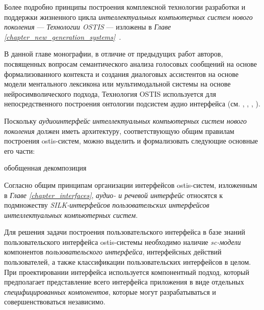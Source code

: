 Более подробно принципы построения комплексной технологии разработки и поддержки жизненного цикла \textit{интеллектуальных компьютерных систем нового поколения} --- \textit{Технологии OSTIS} --- изложены в \textit{Главе \ref{chapter_new_generation_systems}~}.

В данной главе монографии, в отличие от предыдущих работ авторов, посвященных вопросам семантического анализа голосовых сообщений на основе формализованного контекста и создания диалоговых ассистентов на основе модели ментального лексикона или мультимодальной системы на основе нейросимволического подхода, Технология OSTIS используется для непосредственного построения онтологии подсистем аудио интерфейса (см. , , , ).

Поскольку \textit{аудиоинтерфейс} \textit{интеллектуальных компьютерных систем нового поколения} должен иметь архитектуру, соответствующую общим правилам построения ostis-систем, можно выделить и формализовать следующие основные его части: 
\begin{SCn}
	\begin{scnrelfromset}{обобщенная декомпозиция}
	\end{scnrelfromset}
\end{SCn}

Согласно общим принципам организации интерфейсов ostis-систем, изложенным в \textit{Главе \ref{chapter_interfaces}}, \textit{аудио- и речевой интерфейс} относятся к подмножеству \textit{SILK-интерфейсов} \textit{пользовательских интерфейсов} \textit{интеллектуальных компьютерных систем}. 

Для решения задачи построения пользовательского интерфейса в базе знаний пользовательского интерфейса ostis-системы необходимо наличие \textit{sc-модели} компонентов \textit{пользовательского интерфейса}, интерфейсных действий пользователей, а также классификации пользовательских интерфейсов в целом. При проектировании интерфейса используется компонентный подход, который предполагает представление всего интерфейса приложения в виде отдельных \textit{специфицированных компонентов}, которые могут разрабатываться и совершенствоваться независимо.


